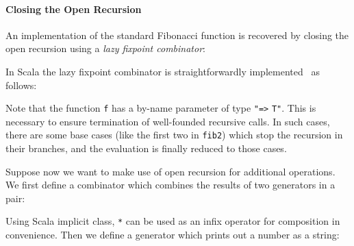 \paragraph{Closing the Open Recursion} An implementation of
 the standard Fibonacci function is recovered by closing
the open recursion using a \emph{lazy fixpoint combinator}:


In Scala the lazy fixpoint combinator is straightforwardly implemented~\cite{} as follows:

\noindent Note that the function \lstinline{f} has a by-name parameter
of type \lstinline{"=>} \lstinline{T"}. This is necessary to ensure
termination of well-founded recursive calls. In such cases,
there are some base cases (like the first two in
\lstinline{fib2}) which stop the recursion in their branches, and the
evaluation is finally reduced to those cases.

\begin{comment}
If we close the recursion on \lstinline{fib2} only, the evaluation of \lstinline{fix(fib2)(2)}, namely the above \lstinline{x2} is processed as follows:
\begin{lstlisting}[language=Haskell,keywords={}]
   fix(fib2)(2)
= lazy val a = fib2(a); a.apply(2)
= lazy val a = fib2(a); fib2(a)(2)
= ... (the third case in fib2)
= lazy val a = fib2(a); a.apply(1) + a.apply(0)
= lazy val a = fib2(a); fib2(a)(1) + fib2(a)(0)
= ... (the first two cases in fib2)
= lazy val a = fib2(a); 1 + 0
= 1
\end{lstlisting}
which behaves similarly as \lstinline{fib(2)}. The process of evaluation will terminate if there are some base cases (like the first two in
\lstinline{fib2}) which stop the recursion in their branches, and the evaluation is finally reduced to those cases.
\end{comment}

Suppose now we want to make use of open recursion for additional operations. We first define a combinator which combines the results of two generators in a pair:

Using Scala implicit class, \lstinline{*} can be used as an infix operator for composition in convenience.
Then we define a generator which prints out a number as a string:

